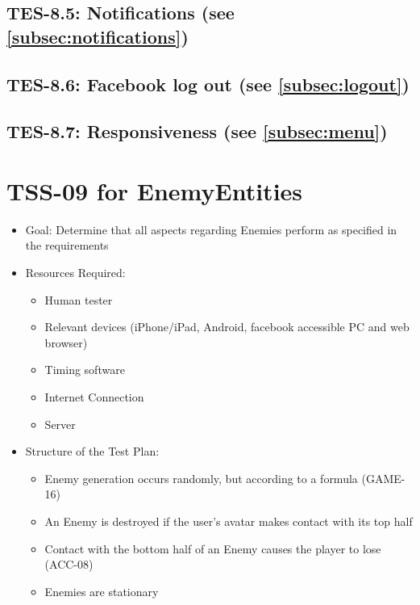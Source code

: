 \subsection{TES-8.5: Notifications  (see \ref{subsec:notifications})}
\subsection{TES-8.6: Facebook log out  (see \ref{subsec:logout})}
\subsection{TES-8.7: Responsiveness (see \ref{subsec:menu})}

\section{TSS-09 for EnemyEntities}
\begin{itemize}
\item Goal: Determine that all aspects regarding Enemies perform as specified in the requirements

\item Resources Required:
\begin{itemize}
\item Human tester
\item Relevant devices (iPhone/iPad, Android, facebook accessible PC and web browser)
\item Timing software
\item Internet Connection 
\item Server
\end{itemize}

\item Structure of the Test Plan: 
\begin{itemize}
\item Enemy generation occurs randomly, but according to a formula (GAME-16)
\item An Enemy is destroyed if the user's avatar makes contact with its top half
\item Contact with the bottom half of an Enemy causes the player to lose (ACC-08)
\item Enemies are stationary

\end{itemize}
\end{itemize}


